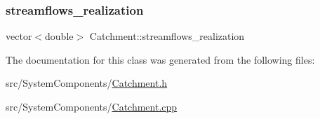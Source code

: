 \mbox{\label{classCatchment_aaf04c295ecd6b666fa1439d3d5bc072a}} 
\subsubsection{\texorpdfstring{streamflows\+\_\+realization}{streamflows\_realization}}
{\footnotesize\ttfamily vector$<$double$>$ Catchment\+::streamflows\+\_\+realization\hspace{0.3cm}{\ttfamily [protected]}}



The documentation for this class was generated from the following files\+:\begin{DoxyCompactItemize}
\item 
src/\+System\+Components/\mbox{\hyperlink{Catchment_8h}{Catchment.\+h}}\item 
src/\+System\+Components/\mbox{\hyperlink{Catchment_8cpp}{Catchment.\+cpp}}\end{DoxyCompactItemize}
